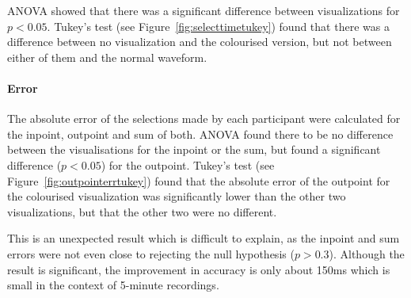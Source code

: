 ANOVA showed that there was a significant difference between visualizations for $p < 0.05$. Tukey's test (see
Figure~\ref{fig:selecttimetukey}) found that there was a difference between no visualization and the colourised version,
but not between either of them and the normal waveform.

\paragraph{Error}
The absolute error of the selections made by each participant were calculated for the inpoint, outpoint and sum of
both. ANOVA found there to be no difference between the visualisations for the inpoint or the sum, but found a
significant difference ($p < 0.05$) for the outpoint.  Tukey's test (see Figure~\ref{fig:outpointerrtukey}) found that
the absolute error of the outpoint for the colourised visualization was significantly lower than the other two
visualizations, but that the other two were no different.

This is an unexpected result which is difficult to explain, as the inpoint and sum errors were not even close to
rejecting the null hypothesis ($p > 0.3$).  Although the result is significant, the improvement in accuracy is only
about 150ms which is small in the context of 5-minute recordings.



